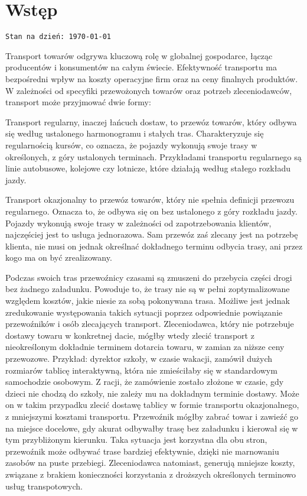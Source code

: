 \chapter{Wstęp}
\texttt{Stan na dzień: \today}

Transport towarów odgrywa kluczową rolę w globalnej gospodarce, łącząc producentów i konsumentów na całym świecie. Efektywność transportu ma bezpośredni wpływ na koszty operacyjne firm oraz na ceny finalnych produktów. W zależności od specyfiki przewożonych towarów oraz potrzeb zleceniodawców, transport może przyjmować dwie formy:

\label{sec:przewoz_regularny}
Transport regularny, inaczej łańcuch dostaw, to przewóz towarów, który odbywa się według ustalonego harmonogramu i stałych tras. Charakteryzuje się regularnością kursów, co oznacza, że pojazdy wykonują swoje trasy w określonych, z góry ustalonych terminach. Przykładami transportu regularnego są linie autobusowe, kolejowe czy lotnicze, które działają według stałego rozkładu jazdy.

\label{sec:transport_okazjonalny}
Transport okazjonalny to przewóz towarów, który nie spełnia definicji przewozu regularnego. Oznacza to, że odbywa się on bez ustalonego z góry rozkładu jazdy. Pojazdy wykonują swoje trasy w zależności od zapotrzebowania klientów, najczęściej jest to usługa jednorazowa. Sam przewóz zaś zlecany jest na potrzebę klienta, nie musi on jednak określnać dokładnego terminu odbycia trasy, ani przez kogo ma on być zrealizowany.

Podczas swoich tras przewoźnicy czasami są zmuszeni do przebycia części drogi bez żadnego załadunku. Powoduje to, że trasy nie są w pełni zoptymalizowane względem kosztów, jakie niesie za sobą pokonywana trasa. Możliwe jest jednak zredukowanie występowania takich sytuacji poprzez odpowiednie powiązanie przewoźników i osób zlecających transport. Zleceniodawca, który nie potrzebuje dostawy towaru w konkretnej dacie, mógłby wtedy zlecić transport z nieokreślonym dokładnie terminem dotarcia towaru, w zamian za niższe ceny przewozowe. Przykład: dyrektor szkoły, w czasie wakacji, zamówił dużych rozmiarów tablicę interaktywną, która nie zmieściłaby się w standardowym samochodzie osobowym. Z racji, że zamówienie zostało złożone w czasie, gdy dzieci nie chodzą do szkoły, nie zależy mu na dokładnym terminie dostawy. Może on w takim przypadku zlecić dostawę tablicy w formie transportu okazjonalnego, z mniejszymi kosztami transportu. Przewoźnik mógłby zabrać towar i zawieźć go na miejsce docelowe, gdy akurat odbywałby trasę bez załadunku i kierował się w tym przybliżonym kierunku. Taka sytuacja jest korzystna dla obu stron, przewoźnik może odbywać trase bardziej efektywnie, dzięki nie marnowaniu zasobów na puste przebiegi. Zleceniodawca natomiast, generują mniejsze koszty, związane z brakiem konieczności korzystania z droższych określonych terminowo usług transpotowych.


